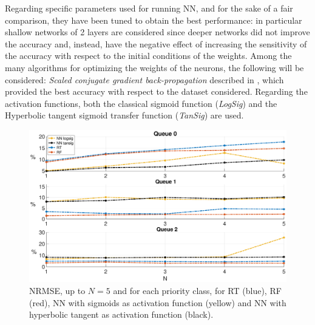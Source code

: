 Regarding specific parameters used for running NN, and for the sake of a fair comparison, they have been tuned to obtain the best performance: in particular shallow networks of 2 layers are considered since deeper networks did not improve the accuracy and, instead, have the negative effect of increasing the sensitivity of the accuracy with respect to the initial conditions of the weights. Among the many algorithms for optimizing the weights of the neurons, the following will be considered: \textit{Scaled conjugate gradient back-propagation} described in \cite{Moller1990}, which provided the best accuracy with respect to the dataset considered. Regarding the activation functions, both the classical sigmoid function (\textit{LogSig}) and the Hyperbolic tangent sigmoid transfer function (\textit{TanSig}) are used.
\begin{figure}[h!]
	\centering
	\includegraphics[trim={120 0 120 0},width=0.9\linewidth]{figure/NRMSENNvsRTvsRF.eps}
	\vspace{-0.2cm}
	\caption{NRMSE, up to $N=5$ and for each priority class, for RT (blue), RF (red), NN with sigmoids as activation function (yellow) and NN with hyperbolic tangent as activation function (black).}
	\label{fig:{NRMSE}}
\end{figure}


